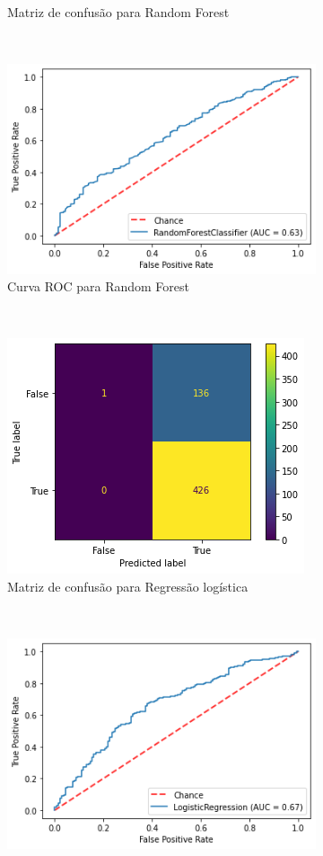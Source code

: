 \begin{figure}[htb]
\begin{subfigure}[b]{0.45\textwidth}
        \caption{Matriz de confusão para Random Forest}
        \label{fig:resultadosbase-de-dados-28.3.1-confusion-matrix-randomforest-monthly-cnae}
    \end{subfigure} ~ \quad
    \begin{subfigure}[b]{0.45\textwidth}
        \includegraphics[scale=0.55]{images/base-de-dados-28.3.2-roc-curve-randomforest-monthly-cnae.png}
        \caption{Curva ROC para Random Forest}
        \label{fig:resultados:base-de-dados-28.3.2-roc-curve-randomforest-monthly-cnae}
    \end{subfigure} ~ \\
    \begin{subfigure}[b]{0.45\textwidth}
        \includegraphics[scale=0.55]{images/base-de-dados-28.3.7-confusion-matrix-logregression-monthly-cnae.png}
        \caption{Matriz de confusão para Regressão logística}
        \label{fig:resultados:base-de-dados-28.3.7-confusion-matrix-logregression-monthly-cnae}
    \end{subfigure} ~ \quad
    \begin{subfigure}[b]{0.45\textwidth}
        \includegraphics[scale=0.55]{images/base-de-dados-28.3.8-roc-curve-logregression-monthly-cnae.png}

\end{subfigure}
\end{figure}
